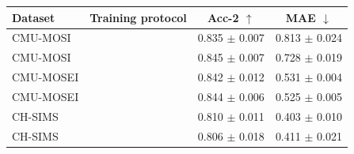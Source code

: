 
\begin{tabular}{llcc}
\toprule
Dataset & Training protocol & Acc-2 $\uparrow$ & MAE $\downarrow$ \\
\midrule
CMU-MOSI & \tokenlevel{} & 0.835 $\pm$ 0.007 & 0.813 $\pm$ 0.024 \\
CMU-MOSI & \modlevel{} & 0.845 $\pm$ 0.007 & 0.728 $\pm$ 0.019 \\
CMU-MOSEI & \tokenlevel{} & 0.842 $\pm$ 0.012 & 0.531 $\pm$ 0.004 \\
CMU-MOSEI & \modlevel{} & 0.844 $\pm$ 0.006 & 0.525 $\pm$ 0.005 \\
CH-SIMS & \tokenlevel{} & 0.810 $\pm$ 0.011 & 0.403 $\pm$ 0.010 \\
CH-SIMS & \modlevel{} & 0.806 $\pm$ 0.018 & 0.411 $\pm$ 0.021 \\
\bottomrule
\end{tabular}
